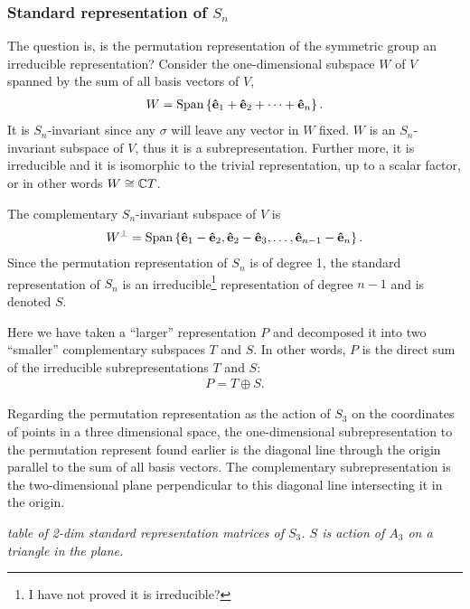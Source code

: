 \subsubsection{Standard representation of $S_n$}\label{sect:standSn}

	The question is, is the permutation representation of the symmetric group an irreducible representation? Consider the one-dimensional subspace $W$ of $V$ spanned by the sum of all basis vectors of $V$,
	\begin{align}
		W = \text{Span}\left\lbrace \mathbf{\hat{e}}_1 + \mathbf{\hat{e}}_2 + \dots + \mathbf{\hat{e}}_n \right\rbrace.
	\end{align}
	It is $S_n$-invariant since any $\sigma$ will leave any vector in $W$ fixed. $W$ is an $S_n$-invariant subspace of $V$, thus it is a subrepresentation. Further more, it is irreducible and it is isomorphic to the trivial representation, up to a scalar factor, or in other words $W \cong \mathbb{C} T$.
	
	The complementary $S_n$-invariant subspace of $V$ is 
	\begin{align}
		W^\perp = \text{Span}\left\lbrace \mathbf{\hat{e}}_1 - \mathbf{\hat{e}}_2, \mathbf{\hat{e}}_2 - \mathbf{\hat{e}}_3, \dots, \mathbf{\hat{e}}_{n-1} - \mathbf{\hat{e}}_n \right\rbrace.
	\end{align}
	Since the permutation representation of $S_n$ is of degree 1, the standard representation of $S_n$ is an irreducible\footnote{I have not proved it is irreducible?} representation of degree $n-1$ and is denoted $S$. 
	
	Here we have taken a ``larger'' representation $P$ and decomposed it into two ``smaller'' complementary subspaces $T$ and $S$. In other words, $P$ is the direct sum of the irreducible subrepresentations $T$ and $S$:
	\begin{align}
		P = T \oplus S.
	\end{align}
	
	\begin{example}\label{ex:standS3}
		Regarding the permutation representation as the action of $S_3$ on the coordinates of points in a three dimensional space, the one-dimensional subrepresentation to the permutation represent found earlier is the diagonal line through the origin parallel to the sum of all basis vectors. The complementary subrepresentation is the two-dimensional plane perpendicular to this diagonal line intersecting it in the origin.
		
		
		\textit{table of 2-dim standard representation matrices of $S_3$. $S$ is action of $A_3$ on a triangle in the plane.}
		
	\end{example}

